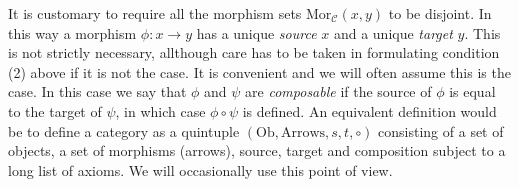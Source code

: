 \noindent
It is customary to require all the morphism sets
$\text{Mor}_{\mathcal{C}}(x, y)$ to be disjoint.
In this way a morphism $\phi: x \to y$ has a unique {\it source} $x$
and a unique {\it target} $y$. This is not strictly necessary,
allthough care has to be taken in formulating condition (2) above
if it is not the case. It is convenient and we will often assume
this is the case. In this case we say that $\phi$ and $\psi$ are
{\it composable} if the source of $\phi$ is equal to the
target of $\psi$, in which case $\phi \circ \psi$ is defined.
An equivalent definition would be to define a category
as a quintuple $(\text{Ob}, \text{Arrows}, s, t, \circ)$
consisting of a set of objects, a set of morphisms (arrows),
source, target and composition subject to a long list of axioms.
We will occasionally use this point of view.

